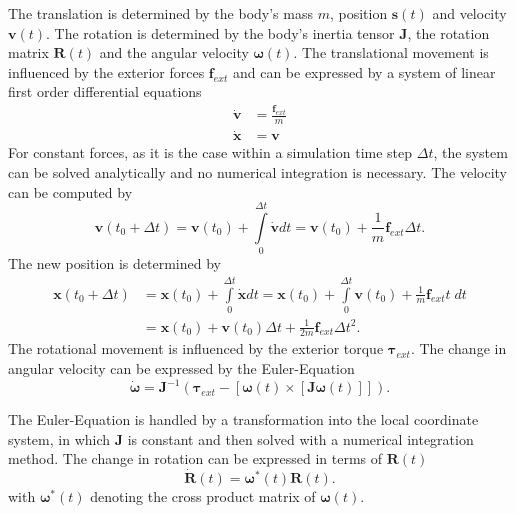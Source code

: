 The translation is determined by the body's mass $m$, position $\mathbf s(t)$ and velocity $\mathbf v(t)$. The rotation is determined by the body's inertia tensor $\mathbf J$, the rotation matrix $\mathbf R(t)$ and the angular velocity $\boldsymbol{\omega}(t)$.  The translational movement is influenced by the exterior forces $\mathbf f_{ext}$ and can be expressed by a system of linear first order differential equations
\begin{align}
    \dot{\mathbf{v}}&=\frac{\mathbf f_{ext}}{m}\\
     \dot{\mathbf{x}}&=\mathbf v 
\end{align}
For constant forces, as it is the case within a simulation time step $\Delta t$, the system can be solved analytically and no numerical integration is necessary. The velocity can be computed by
\begin{equation}
      \mathbf v(t_0+\Delta t)=\mathbf v(t_0) +\int\limits_{0}^{\Delta t}\dot {\mathbf{v}}dt=\mathbf v(t_0)+\frac{1}{m} \mathbf f_{ext}\Delta t.
\end{equation}
The new position is determined by
\begin{align}      
      \mathbf x(t_0+\Delta t)&=\mathbf x(t_0)+\int\limits_{0}^{\Delta t}\dot {\mathbf{x}}dt=\mathbf x(t_0)+\int\limits_{0}^{\Delta t}\mathbf v(t_0)+\frac{1}{m}\mathbf f_{ext} t \;dt\\      
     &=\mathbf x(t_0)+\mathbf v(t_0)\Delta t + \frac{1}{2m}\mathbf f_{ext}\Delta t^2.
\end{align}
The rotational movement is influenced by the exterior torque $\boldsymbol \tau_{ext}$. The change in angular velocity can be expressed by the Euler-Equation
\begin{equation}
       	\boldsymbol {\dot{\omega}} =\mathbf J^{-1}(\boldsymbol \tau_{ext}-[\boldsymbol \omega(t)\times[\mathbf J\boldsymbol \omega(t)]]).
\end{equation}

The Euler-Equation is handled by a transformation into the local coordinate system, in which $\mathbf J$ is constant and then solved with a numerical integration method.
The change in rotation can be expressed in terms of $\mathbf R(t)$ 
\begin{equation}
\label{eq::dR_R}
		\dot{\mathbf{R}}(t)=\boldsymbol \omega^*(t) \mathbf R(t).
\end{equation}
with $\boldsymbol \omega^*(t)$ denoting the cross product matrix of $\boldsymbol \omega(t)$.

